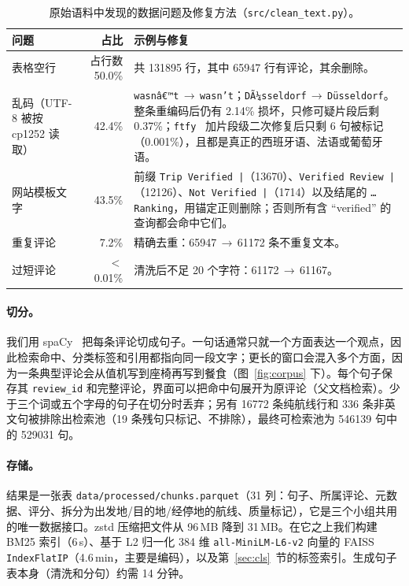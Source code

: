 \documentclass[10pt,twocolumn,a4paper]{article}
\newcommand{\sref}[1]{第~\ref{#1}~节}
\begin{document}
\begin{table}[t]
\centering\small
\caption{原始语料中发现的数据问题及修复方法（\nolinkurl{src/clean_text.py}）。}
\label{tab:cleaning}
\begin{tabularx}{\textwidth}{@{}P{42mm}rY@{}}
\toprule
\textbf{问题} & \textbf{占比} & \textbf{示例与修复} \\
\midrule
表格空行 & 占行数 50.0\% & 共 \num{131895} 行，其中 \num{65947} 行有评论，其余删除。 \\
乱码（UTF-8 被按 cp1252 读取） & 42.4\% & \texttt{wasnâ€™t}\,$\to$\,\texttt{wasn't}；\texttt{DÃ¼sseldorf}\,$\to$\,\texttt{Düsseldorf}。整条重编码后仍有 2.14\% 损坏，只修可疑片段后剩 0.37\%；\texttt{ftfy}~\cite{ftfy} 加片段级二次修复后只剩 6 句被标记（0.001\%），且都是真正的西班牙语、法语或葡萄牙语。 \\
网站模板文字 & 43.5\% & 前缀 \texttt{Trip Verified |}（\num{13670}）、\texttt{Verified Review |}（\num{12126}）、\texttt{Not Verified |}（\num{1714}）以及结尾的 \texttt{… Ranking}，用锚定正则删除；否则所有含 “verified” 的查询都会命中它们。 \\
重复评论 & 7.2\% & 精确去重：\num{65947}\,$\to$\,\num{61172} 条不重复文本。 \\
过短评论 & $<$0.01\% & 清洗后不足 20 个字符：\num{61172}\,$\to$\,\num{61167}。 \\
\bottomrule
\end{tabularx}
\end{table}

\paragraph{切分。}我们用 spaCy~\cite{spacy} 把每条评论切成句子。一句话通常只就一个方面表达一个观点，因此检索命中、分类标签和引用都指向同一段文字；更长的窗口会混入多个方面，因为一条典型评论会从值机写到座椅再写到餐食（图~\ref{fig:corpus} 下）。每个句子保存其 \nolinkurl{review_id} 和完整评论，界面可以把命中句展开为原评论（父文档检索）。少于三个词或五个字母的句子在切分时丢弃；另有 \num{16772} 条纯航线行和 336 条非英文句被排除出检索池（19 条残句只标记、不排除），最终可检索池为 \num{546139} 句中的 \num{529031} 句。

\paragraph{存储。}结果是一张表 \nolinkurl{data/processed/chunks.parquet}（31 列：句子、所属评论、元数据、评分、拆分为出发地/目的地/经停地的航线、质量标记），它是三个小组共用的唯一数据接口。zstd 压缩把文件从 96\,MB 降到 31\,MB。在它之上我们构建 BM25 索引（6\,s）、基于 L2 归一化 384 维 \texttt{all-MiniLM-L6-v2} 向量的 FAISS \texttt{IndexFlatIP}（4.6\,min，主要是编码），以及\sref{sec:cls}的标签索引。生成句子表本身（清洗和分句）约需 14 分钟。
\end{document}
